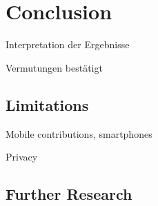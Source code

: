 \chapter{Conclusion}\label{ch:conclusion}

\begin{todos}
    \item Interpretation der Ergebnisse
    \item Vermutungen bestätigt
\end{todos}



\section{Limitations}

\begin{todos}
    \item Mobile contributions, smartphones
    \item Privacy
\end{todos}

\section{Further Research}
